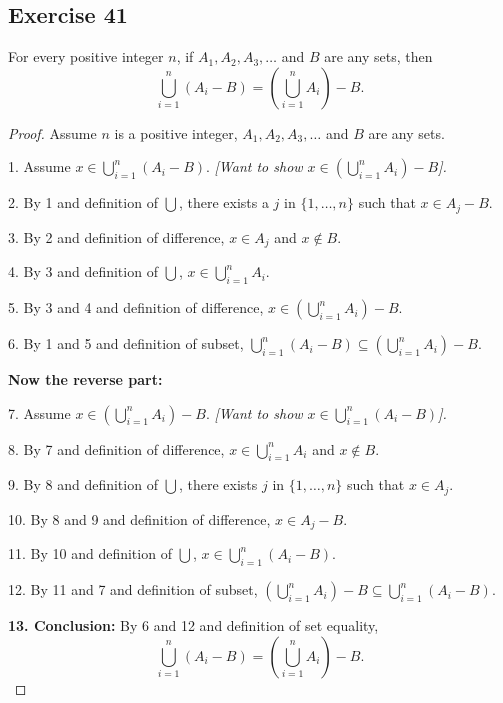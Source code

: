 \documentclass[14pt]{extarticle}
\newcommand{\dps}{\displaystyle}
\begin{document}
\subsection{Exercise 41}
For every positive integer $n$, if \(A_1, A_2, A_3, \ldots\) and $B$ are any sets, then
\[
\bigcup_{i=1}^n (A_i - B) = \left(\bigcup_{i=1}^n A_i\right) - B.
\]
\begin{proof}
Assume $n$ is a positive integer, \(A_1, A_2, A_3, \ldots\) and $B$ are any sets.

1. Assume \(\dps x \in \bigcup_{i=1}^n (A_i - B)\). {\it [Want to show \(\dps x \in \left(\bigcup_{i=1}^n A_i\right) - B\)].}

2. By 1 and definition of \(\dps \bigcup\), there exists a $j$ in \(\{1, \ldots, n\}\) such that \(x \in A_j - B\).

3. By 2 and definition of difference, \(x \in A_j\) and \(x \notin B\).

4. By 3 and definition of $\dps \bigcup$, \(\dps x \in \bigcup_{i=1}^n A_i\).

5. By 3 and 4 and definition of difference, \(\dps x \in \left(\bigcup_{i=1}^n A_i\right) - B\).

6. By 1 and 5 and definition of subset, \(\dps \bigcup_ {i=1}^n (A_i - B) \subseteq \left(\bigcup_{i=1}^n A_i\right) - B.\)

{\bf Now the reverse part:}

7. Assume \(\dps x \in \left(\bigcup_{i=1}^n A_i\right) - B\). {\it [Want to show \(\dps x \in \bigcup_{i=1}^n (A_i - B)\)].}

8. By 7 and definition of difference, \(\dps x \in \bigcup_{i=1}^n A_i\) and \(x \notin B\).

9. By 8 and definition of $\dps \bigcup$, there exists $j$ in \(\{1, \ldots, n\}\) such that \(x \in A_j\).

10. By 8 and 9 and definition of difference, \(x \in A_j - B\).

11. By 10 and definition of $\dps \bigcup$, \(x \in \dps \bigcup_{i=1}^n (A_i - B)\).

12. By 11 and 7 and definition of subset, \(\dps \left( \bigcup_{i=1}^n A_i\right) - B \subseteq \bigcup_{i=1}^n (A_i - B)\).

{\bf 13. Conclusion:} By 6 and 12 and definition of set equality,
\[
\bigcup_{i=1}^n (A_i - B) = \left(\bigcup_{i=1}^n A_i\right) - B.
\] 
\end{proof}
\end{document}
